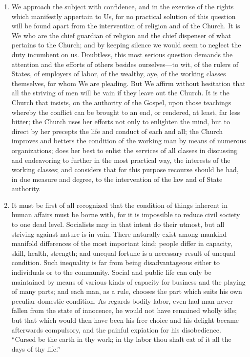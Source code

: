 \documentclass{book}
\begin{document}
\begin{enumerate}
	\item We approach the subject with confidence, and in the exercise of the rights which manifestly appertain to Us, for no practical solution of this question will be found apart from the intervention of religion and of the Church. It is We who are the chief guardian of religion and the chief dispenser of what pertains to the Church; and by keeping silence we would seem to neglect the duty incumbent on us. Doubtless, this most serious question demands the attention and the efforts of others besides ourselves—to wit, of the rulers of States, of employers of labor, of the wealthy, aye, of the working classes themselves, for whom We are pleading. But We affirm without hesitation that all the striving of men will be vain if they leave out the Church. It is the Church that insists, on the authority of the Gospel, upon those teachings whereby the conflict can be brought to an end, or rendered, at least, far less bitter; the Church uses her efforts not only to enlighten the mind, but to direct by her precepts the life and conduct of each and all; the Church improves and betters the condition of the working man by means of numerous organizations; does her best to enlist the services of all classes in discussing and endeavoring to further in the most practical way, the interests of the working classes; and considers that for this purpose recourse should be had, in due measure and degree, to the intervention of the law and of State authority.


	\item It must be first of all recognized that the condition of things inherent in human affairs must be borne with, for it is impossible to reduce civil society to one dead level. Socialists may in that intent do their utmost, but all striving against nature is in vain. There naturally exist among mankind manifold differences of the most important kind; people differ in capacity, skill, health, strength; and unequal fortune is a necessary result of unequal condition. Such inequality is far from being disadvantageous either to individuals or to the community. Social and public life can only be maintained by means of various kinds of capacity for business and the playing of many parts; and each man, as a rule, chooses the part which suits his own peculiar domestic condition. As regards bodily labor, even had man never fallen from the state of innocence, he would not have remained wholly idle; but that which would then have been his free choice and his delight became afterwards compulsory, and the painful expiation for his disobedience. “Cursed be the earth in thy work; in thy labor thou shalt eat of it all the days of thy life.”\footnotemark[4]



\end{enumerate}
\end{document}
